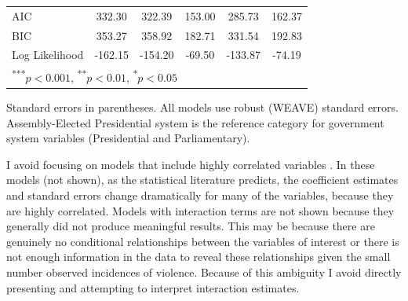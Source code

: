 \documentclass[a4paper]{article}\usepackage{graphicx, color}
\begin{document}
\begin{table}
\begin{center}
\begin{tabular}{l c c c c c }
\hline
AIC                  & 332.30        & 322.39       & 153.00       & 285.73      & 162.37        \\
BIC                  & 353.27        & 358.92       & 182.71       & 331.54      & 192.83        \\
Log Likelihood       & -162.15       & -154.20      & -69.50       & -133.87     & -74.19        \\
\hline
\multicolumn{6}{l}{\scriptsize{\textsuperscript{***}$p<0.001$, 
  \textsuperscript{**}$p<0.01$, 
  \textsuperscript{*}$p<0.05$}}
\end{tabular}


\end{center}
{\scriptsize{
    Standard errors in parentheses. All models use robust (WEAVE) standard errors. \\
    Assembly-Elected Presidential system is the reference category for government system variables (Presidential and Parliamentary). \\
}}
\end{table}

I avoid focusing on models that include highly correlated variables \citep[see][]{Achen2002, Schrodt2006}. In these models (not shown), as the statistical literature predicts, the coefficient estimates and standard errors change dramatically for many of the variables, because they are highly correlated. Models with interaction terms are not shown because they generally did not produce meaningful results. This may be because there are genuinely no conditional relationships between the variables of interest or there is not enough information in the data to reveal these relationships given the small number observed incidences of violence. Because of this ambiguity I avoid directly presenting and attempting to interpret interaction estimates. 
\end{document}
